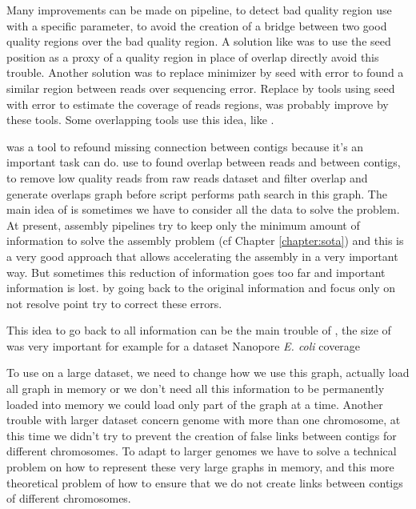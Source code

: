 \documentclass[main.tex]{subfiles}
\begin{document}
Many improvements can be made on \yacrd pipeline, to detect bad quality region \yacrd use \minimap with a specific parameter, to avoid the creation of a bridge between two good quality regions over the bad quality region. A solution like \miniscrub was to use the seed position as a proxy of a quality region in place of overlap directly avoid this trouble. Another solution was to replace minimizer by seed with error to found a similar region between reads over sequencing error. Replace \minimap by tools using seed with error to estimate the coverage of reads regions, was probably improve by these tools. Some overlapping tools use this idea, like \cite{GroupK}. 

\knot was a tool to refound missing connection between contigs because it's an important task \knot can do. \knot use \minimap to found overlap between reads and between contigs, \yacrd to remove low quality reads from raw reads dataset and \fpa filter overlap and generate overlaps graph before \knot script performs path search in this graph. The main idea of \knot is sometimes we have to consider all the data to solve the problem. At present, assembly pipelines try to keep only the minimum amount of information to solve the assembly problem (cf Chapter \ref{chapter:sota}) and this is a very good approach that allows accelerating the assembly in a very important way. But sometimes this reduction of information goes too far and important information is lost. \knot by going back to the original information and focus only on not resolve point try to correct these errors.

\bigskip

This idea to go back to all information can be the main trouble of \knot, the size of \knot \OLC was very important for example for a dataset Nanopore \textit{E. coli} coverage 

To use \knot on a large dataset, we need to change how we use this graph, actually \knot load all graph in memory or we don't need all this information to be permanently loaded into memory we could load only part of the graph at a time. Another trouble with larger dataset concern genome with more than one chromosome, at this time we didn't try to prevent the creation of false links between contigs for different chromosomes. To adapt \knot to larger genomes we have to solve a technical problem on how to represent these very large graphs in memory, and this more theoretical problem of how to ensure that we do not create links between contigs of different chromosomes.
\end{document}
